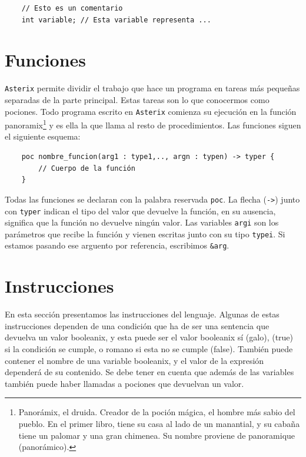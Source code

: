 \documentclass[a4paper, 10pt]{article}
\newcommand{\atx}{\texttt{Asterix} }
\begin{document}
    \begin{verbatim}
    // Esto es un comentario
    int variable; // Esta variable representa ...
    \end{verbatim}

    \section*{Funciones}
    \atx permite dividir el trabajo que hace un programa en tareas más
    pequeñas separadas de la parte principal. Estas tareas son lo que conocermos
    como pociones. Todo programa escrito en \atx comienza su ejecución en la
    función \textsf{panoramix}\footnote{Panorámix, el druida. Creador de la
    poción mágica, el hombre más sabio del pueblo. En el primer libro, tiene su
    casa al lado de un manantial, y su cabaña tiene un palomar y una gran
    chimenea. Su nombre proviene de panoramique (panorámico).} y es ella la que
    llama al resto de procedimientos. Las funciones siguen el siguiente esquema: 

    \begin{verbatim}
    poc nombre_funcion(arg1 : type1,.., argn : typen) -> typer {
        // Cuerpo de la función
    }
    \end{verbatim}
    
    Todas las funciones se declaran con la palabra reservada \texttt{poc}. La
    flecha (\texttt{->}) junto con \texttt{typer} indican el tipo del valor que
    devuelve la función, en su ausencia, significa que la función no devuelve
    ningún valor. Las variables \texttt{argi} son los parámetros que recibe la
    función y vienen escritas junto con su tipo \texttt{typei}. Si estamos
    pasando ese arguento por referencia, escribimos \texttt{\&arg}. 

    \section*{Instrucciones}
    En esta sección presentamos las instrucciones del lenguaje. Algunas de estas
    instrucciones dependen de una condición que ha de ser una sentencia que
    devuelva un valor booleanix, y esta puede ser el valor booleanix sí (galo),
    (true) si la condición se cumple, o romano si esta no se cumple
    (false). También puede contener el nombre de una variable booleanix, y el
    valor de la expresión dependerá de su contenido. Se debe tener en cuenta
    que además de las variables también puede haber llamadas a pociones que
    devuelvan un valor.
\end{document}
